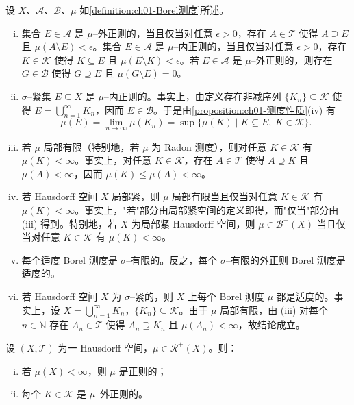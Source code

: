 \documentclass[../../main.tex]{subfiles}%
\begin{document}
\begin{remark}\label{remark:ch01-Borel测度性质}
设 $X$、$\mathcal{A}$、$\mathcal{B}$、$\mu$ 如\cref{definition:ch01-Borel测度}所述。
\begin{enumerate}[(i)]
\item 集合 $E\in\mathcal{A}$ 是 $\mu$--外正则的，当且仅当对任意 $\epsilon>0$，存在 $A\in\mathcal{T}$ 使得 $A\supseteq E$ 且 $\mu(A\setminus E)<\epsilon$。集合 $E\in\mathcal{A}$ 是 $\mu$--内正则的，当且仅当对任意 $\epsilon>0$，存在 $K\in\mathcal{K}$ 使得 $K\subseteq E$ 且 $\mu(E\setminus K)<\epsilon$。若 $E\in\mathcal{A}$ 是 $\mu$--外正则的，则存在 $G\in\mathcal{B}$ 使得 $G\supseteq E$ 且 $\mu(G\setminus E)=0$。
\item $\sigma$--紧集 $E\subseteq X$ 是 $\mu$--内正则的。事实上，由定义存在非减序列 $\{K_n\}\subseteq\mathcal{K}$ 使得 $E=\bigcup_{n=1}^\infty K_n$，因而 $E\in\mathcal{B}$。于是由\cref{proposition:ch01-测度性质}(iv) 有
\[
\mu(E)=\lim_{n\to\infty}\mu(K_n)=\sup\{\mu(K)\mid K\subseteq E,\ K\in\mathcal{K}\}.
\]
\item 若 $\mu$ 局部有限（特别地，若 $\mu$ 为 Radon 测度），则对任意 $K\in\mathcal{K}$ 有 $\mu(K)<\infty$。事实上，对任意 $K\in\mathcal{K}$，存在 $A\in\mathcal{T}$ 使得 $A\supseteq K$ 且 $\mu(A)<\infty$，因而 $\mu(K)\leqslant\mu(A)<\infty$。
\item 若 Hausdorff 空间 $X$ 局部紧，则 $\mu$ 局部有限当且仅当对任意 $K\in\mathcal{K}$ 有 $\mu(K)<\infty$。事实上，"若"部分由局部紧空间的定义即得，而"仅当"部分由 (iii) 得到。特别地，若 $X$ 为局部紧 Hausdorff 空间，则 $\mu\in\mathcal{B}^+(X)$ 当且仅当对任意 $K\in\mathcal{K}$ 有 $\mu(K)<\infty$。
\item 每个适度 Borel 测度是 $\sigma$--有限的。反之，每个 $\sigma$--有限的外正则 Borel 测度是适度的。
\item 若 Hausdorff 空间 $X$ 为 $\sigma$--紧的，则 $X$ 上每个 Borel 测度 $\mu$ 都是适度的。事实上，设 $X=\bigcup_{n=1}^\infty K_n$，$\{K_n\}\subseteq\mathcal{K}$。由于 $\mu$ 局部有限，由 (iii) 对每个 $n\in\mathbb{N}$ 存在 $A_n\in\mathcal{T}$ 使得 $A_n\supseteq K_n$ 且 $\mu(A_n)<\infty$，故结论成立。
\end{enumerate}
\end{remark}

\begin{lemma}\label{lemma:ch01-有限Radon正则}\label{proposition:ch01-正则}
\label{lemma:ch01-紧外正则}
\label{lemma:ch01-正则性}
设 $(X,\mathcal{T})$ 为一 Hausdorff 空间，$\mu\in\mathcal{R}^+(X)$。则：
\begin{enumerate}[(i)]
\item 若 $\mu(X)<\infty$，则 $\mu$ 是正则的；
\item 每个 $K\in\mathcal{K}$ 是 $\mu$--外正则的。
\end{enumerate}
\end{lemma}
\end{document}
